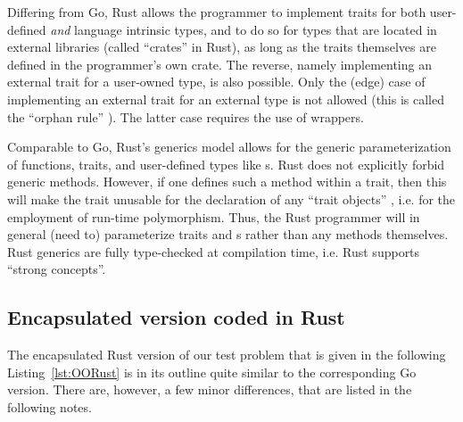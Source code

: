 \documentclass[11pt,oneside]{report}
\newcommand{\code}[1]{{\selectfont\ttfamily{#1}}}
\begin{document}
Differing from Go, Rust allows the programmer to implement traits for
both user-defined \emph{and} language intrinsic types, and to do so
for types that are located in external libraries (called ``crates'' in
Rust), as long as the traits themselves are defined in the
programmer's own crate. The reverse, namely implementing an external
trait for a user-owned type, is also possible. Only the (edge) case of
implementing an external trait for an external type is not allowed
(this is called the ``orphan rule'' \cite{Klabnik_Nichols}). The
latter case requires the use of wrappers.

Comparable to Go, Rust's generics model allows for the generic
parameterization of functions, traits, and user-defined types like
\code{struct}s. Rust does not explicitly forbid generic
methods. However, if one defines such a method within a trait, then
this will make the trait unusable for the declaration of any ``trait
objects'' \cite{Lyon}, i.e. for the employment of run-time
polymorphism. Thus, the Rust programmer will in general (need to)
parameterize traits and \code{struct}s rather than any methods
themselves. Rust generics are fully type-checked at compilation time,
i.e. Rust supports ``strong concepts''.

\subsection{Encapsulated version coded in Rust}

The encapsulated Rust version of our test problem that is given in the
following Listing~\ref{lst:OORust} is in its outline quite similar to
the corresponding Go version. There are, however, a few minor
differences, that are listed in the following notes.
\end{document}
